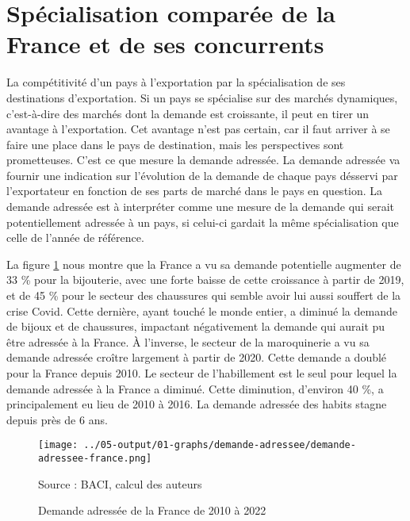 \documentclass[french,10pt,a4paper]{article}
\begin{document}
\section{Spécialisation comparée de la France et de ses concurrents}
La compétitivité d'un pays à l'exportation par la spécialisation de ses destinations d'exportation. Si un pays se spécialise sur des marchés dynamiques, c'est-à-dire des marchés dont la demande est croissante, il peut en tirer un avantage à l'exportation. Cet avantage n'est pas certain, car il faut arriver à se faire une place dans le pays de destination, mais les perspectives sont prometteuses. C'est ce que mesure la demande adressée. La demande adressée va fournir une indication sur l'évolution de la demande de chaque pays désservi par l'exportateur en fonction de ses parts de marché dans le pays en question. La demande adressée est à interpréter comme une mesure de la demande qui serait potentiellement adressée à un pays, si celui-ci gardait la même spécialisation que celle de l'année de référence.

La figure \ref{fig:demande-adressee-france} nous montre que la France a vu sa demande potentielle augmenter de 33 \% pour la bijouterie, avec une forte baisse de cette croissance à partir de 2019, et de 45 \% pour le secteur des chaussures qui semble avoir lui aussi souffert de la crise Covid. Cette dernière, ayant touché le monde entier, a diminué la demande de bijoux et de chaussures, impactant négativement la demande qui aurait pu être adressée à la France. À l'inverse, le secteur de la maroquinerie a vu sa demande adressée croître largement à partir de 2020. Cette demande a doublé pour la France depuis 2010. Le secteur de l'habillement est le seul pour lequel la demande adressée à la France a diminué. Cette diminution, d'environ 40 \%, a principalement eu lieu de 2010 à 2016. La demande adressée des habits stagne depuis près de 6 ans.

\begin{figure}[!h]
  \centering  \texttt{[image: ../05-output/01-graphs/demande-adressee/demande-adressee-france.png]}
  \captionsetup{justification=raggedright,singlelinecheck=false, font=small}
  \caption*{Source : BACI, calcul des auteurs}
  \captionsetup{justification=centering, singlelinecheck=true, font=normalsize}
  \caption{Demande adressée de la France de 2010 à 2022}
  \label{fig:demande-adressee-france}
\end{figure}
\end{document}
